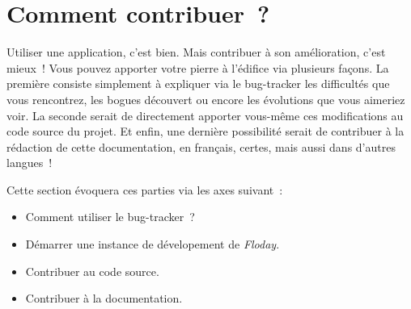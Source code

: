 \section{Comment contribuer~?}
	\begin{intro}
	Utiliser une application, c'est bien. Mais contribuer à son amélioration, c'est mieux~!
	Vous pouvez apporter votre pierre à l'édifice via plusieurs façons.
	La première consiste simplement à expliquer via le bug-tracker les difficultés que vous rencontrez, les bogues découvert ou encore les évolutions que vous aimeriez voir.
	La seconde serait de directement apporter vous-même ces modifications au code source du projet.
	Et enfin, une dernière possibilité serait de contribuer à la rédaction de cette documentation, en français, certes, mais aussi dans d'autres langues~!

	Cette section évoquera ces parties via les axes suivant~:
	\begin{itemize}
		\item Comment utiliser le bug-tracker~?
		\item Démarrer une instance de dévelopement de \emph{Floday}.
		\item Contribuer au code source.
		\item Contribuer à la documentation.
	\end{itemize}
\end{intro}





